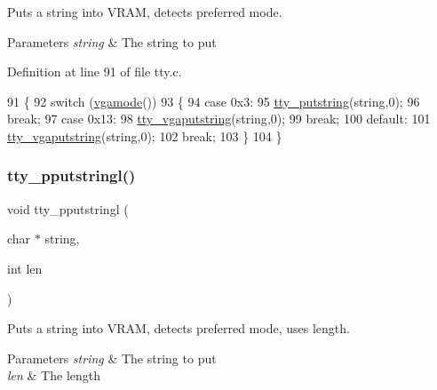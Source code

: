 Puts a string into V\+R\+AM, detects preferred mode. 


\begin{DoxyParams}{Parameters}
{\em string} & The string to put \\
\hline
\end{DoxyParams}


Definition at line 91 of file tty.\+c.


\begin{DoxyCode}
91                                   \{
92     \textcolor{keywordflow}{switch} (\hyperlink{a00041_af6d170c9401ea8f94d4c5cf09347cca7_af6d170c9401ea8f94d4c5cf09347cca7}{vgamode}())
93     \{
94     \textcolor{keywordflow}{case} 0x3:
95         \hyperlink{a00140_a5b5bf610a57f3c59b2851fa2652081ec_a5b5bf610a57f3c59b2851fa2652081ec}{tty\_putstring}(\textcolor{keywordtype}{string},0);
96         \textcolor{keywordflow}{break};
97     \textcolor{keywordflow}{case} 0x13:
98         \hyperlink{a00140_a05ca3f5e64f38fec173b635ca8465415_a05ca3f5e64f38fec173b635ca8465415}{tty\_vgaputstring}(\textcolor{keywordtype}{string},0);
99         \textcolor{keywordflow}{break};
100     \textcolor{keywordflow}{default}:
101         \hyperlink{a00140_a05ca3f5e64f38fec173b635ca8465415_a05ca3f5e64f38fec173b635ca8465415}{tty\_vgaputstring}(\textcolor{keywordtype}{string},0);
102         \textcolor{keywordflow}{break};
103     \}
104 \}
\end{DoxyCode}
\mbox{\label{a00143_abaf93f9e56ddb7b10462070f59e534e4_abaf93f9e56ddb7b10462070f59e534e4}} 
\subsubsection{\texorpdfstring{tty\+\_\+pputstringl()}{tty\_pputstringl()}}
{\footnotesize\ttfamily void tty\+\_\+pputstringl (\begin{DoxyParamCaption}\item[{char $\ast$}]{string,  }\item[{int}]{len }\end{DoxyParamCaption})}



Puts a string into V\+R\+AM, detects preferred mode, uses length. 


\begin{DoxyParams}{Parameters}
{\em string} & The string to put \\
\hline
{\em len} & The length \\
\hline
\end{DoxyParams}


